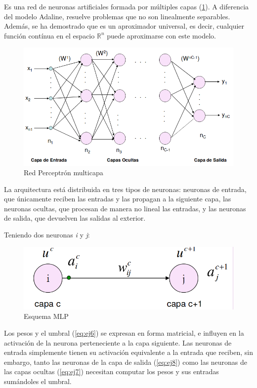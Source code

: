 \documentclass[11pt,spanish,listoffigures,listoftables]{workluis}
\begin{document}
\par Es una red de neuronas artificiales formada por múltiples capas (\ref{fig:mlp}). A diferencia del modelo Adaline, resuelve problemas que no son linealmente separables. Además, se ha demostrado que es un aproximador universal, es decir,  cualquier función contínua en el espacio $\mathbb{R}^n$ puede aproximarse con este modelo. 

\begin{figure}[H]
\centering
\includegraphics[scale=0.5]{mlp}
\caption{Red Perceptrón multicapa \cite{MLP}}\label{fig:mlp}
\end{figure}

\par La arquitectura está distribuida en tres tipos de neuronas: neuronas de entrada, que únicamente reciben las entradas y las propagan a la siguiente capa, las neuronas ocultas, que procesan de manera no lineal las entradas, y las neuronas de salida, que devuelven las salidas al exterior.

\par Teniendo dos neuronas \textit{i} y \textit{j}:

\begin{figure}[H]
\centering
\includegraphics[scale=0.3]{mlpesquema}
\caption{Esquema MLP \cite{MLP}}\label{fig:esquema}
\end{figure}

\par Los pesos y el umbral (\ref{eq:ej6}) se expresan en forma matricial, e influyen en la activación de la neurona perteneciente a la capa siguiente. Las neuronas de entrada simplemente tienen su activación equivalente a la entrada que reciben, sin embargo, tanto las neuronas de la capa de salida (\ref{eq:ej8}) como las neuronas de las capas ocultas (\ref{eq:ej7}) necesitan computar los pesos y sus entradas sumándoles el umbral.
\end{document}
